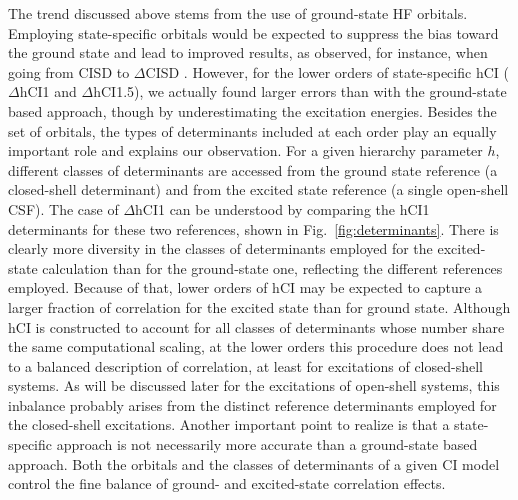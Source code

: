 \documentclass[aip,jcp,reprint,noshowkeys,superscriptaddress]{revtex4-1}
\begin{document}

The trend discussed above stems from the use of ground-state HF orbitals.
Employing state-specific orbitals would be expected to suppress the bias toward the ground state and lead to improved results, as observed, for instance, when going from CISD to $\Delta$CISD \cite{Kossoski_2023}.
However, for the lower orders of state-specific hCI ($\Delta$hCI1 and $\Delta$hCI1.5), we actually found larger errors than with the ground-state based approach, though by underestimating the excitation energies.
Besides the set of orbitals, the types of determinants included at each order play an equally important role and explains our observation.
For a given hierarchy parameter $h$, different classes of determinants are accessed from the ground state reference (a closed-shell determinant) and from the excited state reference (a single open-shell CSF).
The case of $\Delta$hCI1 can be understood by comparing the hCI1 determinants for these two references, shown in Fig.~\ref{fig:determinants}.
There is clearly more diversity in the classes of determinants employed for the excited-state calculation than for the ground-state one, reflecting the different references employed.
Because of that, lower orders of hCI may be expected to capture a larger fraction of correlation for the excited state than for ground state.
Although hCI is constructed to account for all classes of determinants whose number share the same computational scaling,
at the lower orders this procedure does not lead to a balanced description of correlation, at least for excitations of closed-shell systems.
As will be discussed later for the excitations of open-shell systems, this inbalance probably arises from the distinct reference determinants employed for the closed-shell excitations.
%
Another important point to realize is that a state-specific approach is not necessarily more accurate than a ground-state based approach.
Both the orbitals and the classes of determinants of a given CI model control the fine balance of ground- and excited-state correlation effects.
\end{document}
